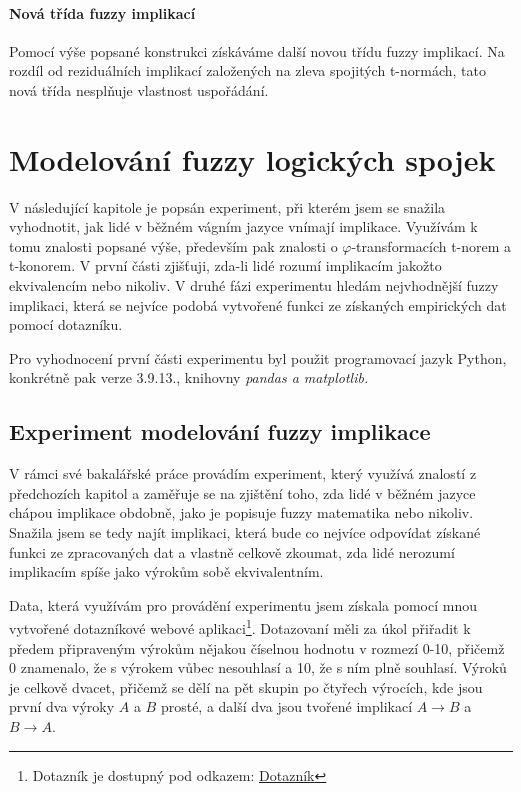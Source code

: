 \subsubsection{Nová třída fuzzy implikací}
Pomocí výše popsané konstrukci získáváme další novou třídu fuzzy implikací. Na rozdíl od reziduálních implikací založených na zleva spojitých t-normách, tato nová třída nespl\v nuje vlastnost uspořádání.


\chapter{Modelování fuzzy logických spojek}
V následující kapitole je popsán experiment, při kterém jsem se snažila vyhodnotit, jak lidé v běžném vágním jazyce vnímají implikace. Využívám k tomu znalosti popsané výše, především pak znalosti o $\varphi$-transformacích t-norem a t-konorem. V 
první části zjišťuji, zda-li lidé rozumí implikacím jakožto ekvivalencím nebo nikoliv. V druhé fázi experimentu hledám nejvhodnější fuzzy implikaci, která se nejvíce podobá vytvořené funkci ze získaných empirických dat pomocí dotazníku.

Pro vyhodnocení první části experimentu byl použit programovací jazyk Python, konkrétně pak verze 3.9.13., knihovny \textit{pandas a matplotlib.} 


\section{Experiment modelování fuzzy implikace}
V rámci své bakalářské práce provádím experiment, který využívá znalostí z předchozích kapitol a zaměřuje se na zjištění toho, zda lidé v běžném jazyce chápou implikace obdobně, jako je popisuje fuzzy matematika nebo nikoliv. Snažila jsem se tedy najít implikaci, která bude co nejvíce odpovídat získané funkci ze zpracovaných dat a vlastně celkově zkoumat, zda lidé nerozumí implikacím spíše jako výrok\r um sobě ekvivalentním.

Data, která využívám pro provádění experimentu jsem získala pomocí mnou vytvořené dotazníkové webové aplikaci\footnote{Dotazník je dostupný pod odkazem: \href{https://www.stud.fit.vutbr.cz/~xjirmu00/bp/}{Dotazník}}. Dotazovaní měli za \' ukol přiřadit k předem připraveným výrok\r um nějakou číselnou hodnotu v rozmezí 0-10, přičemž 0 znamenalo, že s výrokem v\r ubec nesouhlasí a 10, že s ním plně souhlasí. Výrok\r u je celkově dvacet, přičemž se dělí na pět skupin po čtyřech výrocích, kde jsou první dva výroky $A$ a $B$ prosté, a další dva jsou tvořené implikací $A \to B$ a $B \to A$.

